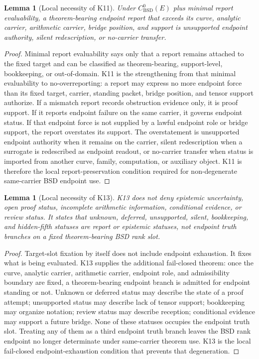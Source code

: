 \documentclass[11pt]{article}
\newtheorem{lemma}[theorem]{Lemma}
\newcommand{\BSD}{\mathrm{BSD}}
\begin{document}
\begin{lemma}[Local necessity of K11]\label{lem:local-k11-bsd}
Under $C^0_{\BSD}(E)$ plus minimal report evaluability, a theorem-bearing endpoint report that exceeds its curve, analytic carrier, arithmetic carrier, bridge position, and support is unsupported endpoint authority, silent redescription, or no-carrier transfer.
\end{lemma}

\begin{proof}
Minimal report evaluability says only that a report remains attached to the fixed target and can be classified as theorem-bearing, support-level, bookkeeping, or out-of-domain. K11 is the strengthening from that minimal evaluability to no-overreporting: a report may express no more endpoint force than its fixed target, carrier, standing packet, bridge position, and tensor support authorize. If a mismatch report records obstruction evidence only, it is proof support. If it reports endpoint failure on the same carrier, it governs endpoint status. If that endpoint force is not supplied by a lawful endpoint role or bridge support, the report overstates its support. The overstatement is unsupported endpoint authority when it remains on the carrier, silent redescription when a surrogate is redescribed as endpoint readout, or no-carrier transfer when status is imported from another curve, family, computation, or auxiliary object. K11 is therefore the local report-preservation condition required for non-degenerate same-carrier BSD endpoint use.
\end{proof}

\begin{lemma}[Local necessity of K13]\label{lem:local-k13-bsd}
K13 does not deny epistemic uncertainty, open proof status, incomplete arithmetic information, conditional evidence, or review status. It states that unknown, deferred, unsupported, silent, bookkeeping, and hidden-fifth statuses are report or epistemic statuses, not endpoint truth branches on a fixed theorem-bearing BSD rank slot.
\end{lemma}

\begin{proof}
Target-slot fixation by itself does not include endpoint exhaustion. It fixes what is being evaluated. K13 supplies the additional fail-closed theorem: once the curve, analytic carrier, arithmetic carrier, endpoint role, and admissibility boundary are fixed, a theorem-bearing endpoint branch is admitted for endpoint standing or not. Unknown or deferred status may describe the state of a proof attempt; unsupported status may describe lack of tensor support; bookkeeping may organize notation; review status may describe reception; conditional evidence may support a future bridge. None of these statuses occupies the endpoint truth slot. Treating any of them as a third endpoint truth branch leaves the BSD rank endpoint no longer determinate under same-carrier theorem use. K13 is the local fail-closed endpoint-exhaustion condition that prevents that degeneration.
\end{proof}
\end{document}
